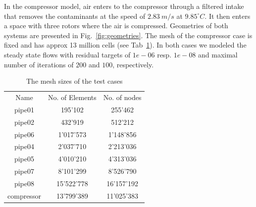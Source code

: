 \documentclass[3p,times]{elsarticle}
\begin{document}
In the compressor model, air enters to the compressor through a filtered intake that removes the contaminants at the speed of $2.83\ m/s$ at $9.85 ^\circ C$. It then enters a space with three rotors where the air is compressed. Geometries of both systems are presented in Fig.~\ref{fig:geometries}. The mesh of the compressor case is fixed and has approx 13 million cells (see Tab~\ref{tab:MeshSize}). In both cases we modeled the steady state flows with residual targets of $1e-06$ resp. $1e-08$ and maximal number of iterations of $200$ and $100$, respectively. 

\begin{table}
	\centering
		\begin{tabular} {|c|c|c|}
			\hline
			Name & No. of Elements & No. of nodes \\			
			pipe01 & 195'102 & 255'462 \\ \hline
			pipe02 & 432'919 & 512'212 \\ \hline
			pipe06 & 1'017'573 & 1'148'856 \\ \hline
			pipe04 & 2'037'710 & 2'213'036 \\ \hline
			pipe05 & 4'010'210 & 4'313'036 \\ \hline			
			pipe07 & 8'101'299 & 8'526'790 \\ \hline
			pipe08 & 15'522'778 & 16'157'192 \\ \hline
			compressor & 13'799'389  & 11'025'383 \\ \hline
		\end{tabular}
	\caption{The mesh sizes of the test cases}
	\label{tab:MeshSize}
\end{table}
\end{document}
